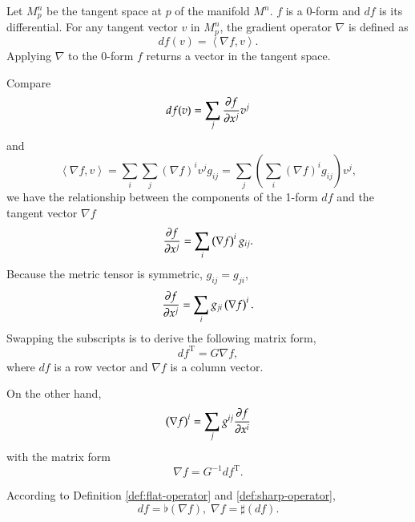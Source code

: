 \documentclass[11pt, a4paper]{book}
\begin{document}
\begin{Definition}
  \label{def:gradient-operator}
  Let $M_p^n$ be the tangent space at $p$ of the manifold $M^n$. $f$ is a 0-form and $df$
  is its differential. For any tangent vector $v$ in $M_p^n$, the gradient operator
  $\nabla$ is defined as
  \begin{equation}
    \label{eq:gradient-operator}
    df(v) = \left\langle \nabla f, v \right\rangle.
  \end{equation}
  Applying $\nabla$ to the 0-form $f$ returns a vector in the tangent space.
\end{Definition}
Compare
\begin{equation*}
  df(v) = \sum_j \frac{\partial f}{\partial x^j} v^j
\end{equation*}
and
\begin{equation*}
  \left\langle \nabla f, v \right\rangle = \sum_i\sum_j \left( \nabla f \right)^i v^j
  g_{ij} = \sum_j \left( \sum_i \left( \nabla f \right)^i g_{ij} \right) v^j,
\end{equation*}
we have the relationship between the components of the 1-form $df$ and the tangent vector
$\nabla f$
\begin{equation*}
  \frac{\partial f}{\partial x^j} = \sum_i \left( \nabla f \right)^i g_{ij}.
\end{equation*}
Because the metric tensor is symmetric, $g_{ij} = g_{ji}$,
\begin{equation}
  \label{eq:gradient-to-df}
  \frac{\partial f}{\partial x^j} = \sum_i g_{ji} \left( \nabla f \right)^i.
\end{equation}
Swapping the subscripts is to derive the following matrix form,
\begin{equation}
  df^{\mathrm{T}} = G \nabla f,
\end{equation}
where $df$ is a row vector and $\nabla f$ is a column vector.

On the other hand,
\begin{equation}
  \label{eq:df-to-gradient}
  \left( \nabla f \right)^i = \sum_j g^{ij} \frac{\partial f}{\partial x^{i}}
\end{equation}
with the matrix form
\begin{equation}
  \nabla f = G^{-1} df^{\mathrm{T}}.
\end{equation}

According to Definition \ref{def:flat-operator} and \ref{def:sharp-operator},
\begin{equation}
  df = \flat(\nabla f), \; \nabla f = \sharp(df).
\end{equation}
\end{document}
